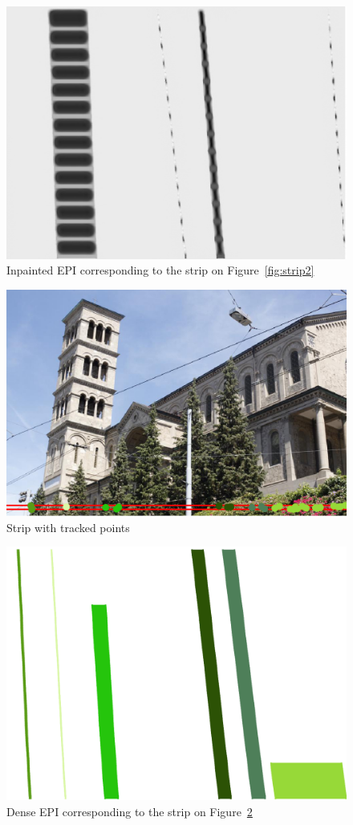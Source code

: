 \begin{itemize}
\begin{figure}[h!]
\centering
\includegraphics[width = 0.7 \textwidth]{./Diagrams/results/Inpainted/424_8_102_7_10_4_inpainted.png}
\caption{Inpainted EPI corresponding to the strip on Figure~\ref{fig:strip2}}
\label{fig:inpainted2}
\end{figure}

\begin{figure}[h!]
\centering
\includegraphics[width = 0.7 \textwidth]{./Diagrams/results/EPIs/306_8_102_7_27_6_strip.png}
\caption{Strip with tracked points}
\label{fig:strip3}
\end{figure}

\begin{figure}[h!]
\centering
\includegraphics[width = 0.7 \textwidth]{./Diagrams/results/EPIs/306_8_102_7_27_6_dense.png}
\caption{Dense EPI corresponding to the strip on Figure~\ref{fig:strip3}}
\label{fig:dense3}
\end{figure}


\end{itemize}
